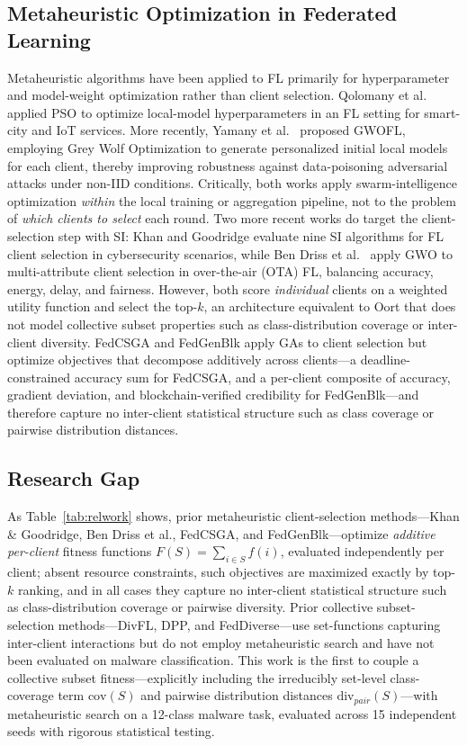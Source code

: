 \documentclass[conference]{IEEEtran}
\begin{document}
\subsection{Metaheuristic Optimization in Federated Learning}
Metaheuristic algorithms have been applied to FL primarily for hyperparameter and model-weight optimization rather than client selection. Qolomany et al.\ \cite{qolomany2020psofl} applied PSO to optimize local-model hyperparameters in an FL setting for smart-city and IoT services. More recently, Yamany et al.\ \cite{yamany2024gwofl} proposed GWOFL, employing Grey Wolf Optimization to generate personalized initial local models for each client, thereby improving robustness against data-poisoning adversarial attacks under non-IID conditions. Critically, both works apply swarm-intelligence optimization \emph{within} the local training or aggregation pipeline, not to the problem of \emph{which clients to select} each round. Two more recent works do target the client-selection step with SI: Khan and Goodridge \cite{khan2024swarm} evaluate nine SI algorithms for FL client selection in cybersecurity scenarios, while Ben Driss et al.\ \cite{bendriss2024gwo} apply GWO to multi-attribute client selection in over-the-air (OTA) FL, balancing accuracy, energy, delay, and fairness. However, both score \emph{individual} clients on a weighted utility function and select the top-$k$, an architecture equivalent to Oort that does not model collective subset properties such as class-distribution coverage or inter-client diversity. FedCSGA \cite{wu2025fedcsga} and FedGenBlk \cite{panimalar2026fedgenblk} apply GAs to client selection but optimize objectives that decompose additively across clients---a deadline-constrained accuracy sum for FedCSGA, and a per-client composite of accuracy, gradient deviation, and blockchain-verified credibility for FedGenBlk---and therefore capture no inter-client statistical structure such as class coverage or pairwise distribution distances.

\subsection{Research Gap}
As Table~\ref{tab:relwork} shows, prior metaheuristic client-selection methods---Khan \& Goodridge, Ben Driss et al., FedCSGA, and FedGenBlk---optimize \emph{additive per-client} fitness functions $F(S)=\sum_{i\in S}f(i)$, evaluated independently per client; absent resource constraints, such objectives are maximized exactly by top-$k$ ranking, and in all cases they capture no inter-client statistical structure such as class-distribution coverage or pairwise diversity. Prior collective subset-selection methods---DivFL, DPP, and FedDiverse---use set-functions capturing inter-client interactions but do not employ metaheuristic search and have not been evaluated on malware classification. This work is the first to couple a collective subset fitness---explicitly including the irreducibly set-level class-coverage term $\text{cov}(S)$ and pairwise distribution distances $\text{div}_{pair}(S)$---with metaheuristic search on a 12-class malware task, evaluated across 15 independent seeds with rigorous statistical testing.
\end{document}
